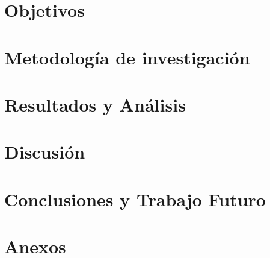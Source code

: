 \documentclass[12pt]{MIA-USA}
\begin{document}
    \chapter{Objetivos}
    
    
    \chapter{Metodolog\'ia de investigación}
    
    
    \chapter{Resultados y An\'alisis}
    
    
    \chapter{Discusi\'on}
    
    
    \chapter{Conclusiones y Trabajo Futuro}
    
    
    \chapter*{Anexos}
    
    
    
    
    
\end{document}
